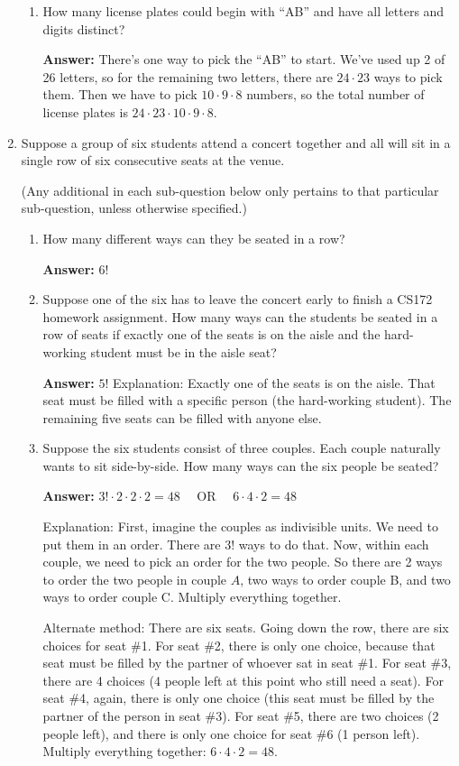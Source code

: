 \documentclass[11pt, letterpaper]{report}
\begin{document}
\begin{enumerate}
\begin{enumerate}
        \item How many license plates could begin with ``AB'' and have all letters and digits distinct?
        
        \textbf{Answer: } There's one way to pick the ``AB'' to start.  We've used up 2 of 26 letters, so for the remaining two letters, there are $24 \cdot 23$ ways to
        pick them.  Then we have to pick $10 \cdot 9 \cdot 8$ numbers, so the total number of license plates is $24 \cdot 23 \cdot 10 \cdot 9 \cdot 8$.
\end{enumerate}


\item
Suppose a group of six students attend a concert together and all will sit in a single
row of six consecutive seats at the venue.

(Any additional in each sub-question below only pertains to that particular sub-question,
unless otherwise specified.) 
\begin{enumerate}
\item
How many different ways can they be seated in a row?

\textbf{Answer: } $6!$

\item Suppose one of the six has to leave the concert early to finish a CS172 homework
assignment. How many ways can the students be seated in a row of seats if exactly one of the seats is on the aisle and the hard-working  student must be in the aisle seat?

\textbf{Answer: } $5!$  Explanation: Exactly one of the seats is on the aisle.  That seat must be filled with a specific person (the hard-working student).  The remaining five
seats can be filled with anyone else.

\item Suppose the six students consist of three couples.  Each couple naturally wants to
sit side-by-side.  How many ways can the six people be seated?

\textbf{Answer:} $3!\cdot 2 \cdot 2 \cdot 2 = 48$ \ \  OR \ \ $6 \cdot 4 \cdot 2 = 48$

Explanation: First, imagine the couples as indivisible units.  We need to put them in an order.  There 
are $3!$ ways to do that.  Now, within each couple, we need to pick an order for the two people.  So there
are 2 ways to order the two people in couple $A$, two ways to order couple B, and two ways to order couple
C.  Multiply everything together.

Alternate method: There are six seats.  Going down the row, there are six choices for seat \#1.
For seat \#2, there is only one choice, because that seat must be filled by the partner of whoever sat in 
seat \#1.  For seat \#3, there are 4 choices (4 people left at this point who still need a seat).  For seat \#4, again, there is only one choice (this seat must be filled by the partner of the person
in seat \#3).  For seat
\#5, there are two choices (2 people left), and there is only one choice for seat \#6 (1 person left).
Multiply everything together: $6 \cdot 4 \cdot 2 = 48$.


\end{enumerate}
\end{enumerate}
\end{document}
